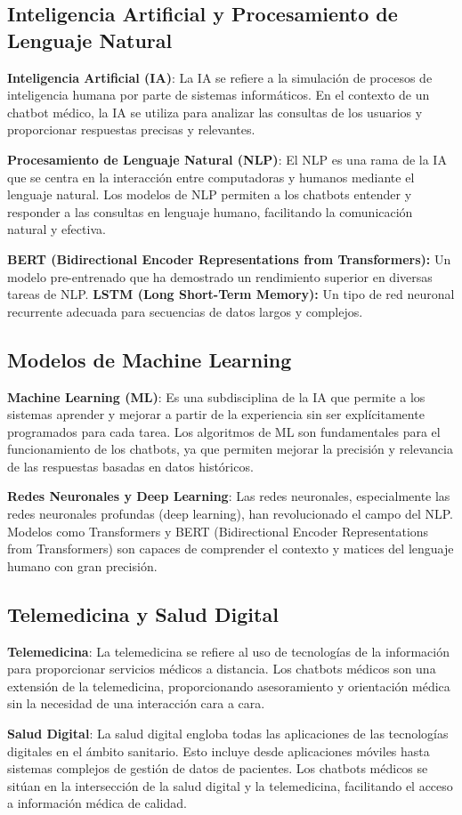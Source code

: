 
\subsection{Inteligencia Artificial y Procesamiento de Lenguaje Natural}

\textbf{Inteligencia Artificial (IA)}: La IA se refiere a la simulación de procesos de inteligencia humana por parte de sistemas informáticos. En el contexto de un chatbot médico, la IA se utiliza para analizar las consultas de los usuarios y proporcionar respuestas precisas y relevantes.

\textbf{Procesamiento de Lenguaje Natural (NLP)}: El NLP es una rama de la IA que se centra en la interacción entre computadoras y humanos mediante el lenguaje natural. Los modelos de NLP permiten a los chatbots entender y responder a las consultas en lenguaje humano, facilitando la comunicación natural y efectiva.

\subitem \textbf {BERT (Bidirectional Encoder Representations from Transformers):} Un modelo pre-entrenado que ha demostrado un rendimiento superior en diversas tareas de NLP.
\subitem \textbf {LSTM (Long Short-Term Memory):} Un tipo de red neuronal recurrente adecuada para secuencias de datos largos y complejos.

\subsection{Modelos de Machine Learning}

\textbf{Machine Learning (ML)}: Es una subdisciplina de la IA que permite a los sistemas aprender y mejorar a partir de la experiencia sin ser explícitamente programados para cada tarea. Los algoritmos de ML son fundamentales para el funcionamiento de los chatbots, ya que permiten mejorar la precisión y relevancia de las respuestas basadas en datos históricos.

\textbf{Redes Neuronales y Deep Learning}: Las redes neuronales, especialmente las redes neuronales profundas (deep learning), han revolucionado el campo del NLP. Modelos como Transformers y BERT (Bidirectional Encoder Representations from Transformers) son capaces de comprender el contexto y matices del lenguaje humano con gran precisión.

\subsection{Telemedicina y Salud Digital}

\textbf{Telemedicina}: La telemedicina se refiere al uso de tecnologías de la información para proporcionar servicios médicos a distancia. Los chatbots médicos son una extensión de la telemedicina, proporcionando asesoramiento y orientación médica sin la necesidad de una interacción cara a cara.

\textbf{Salud Digital}: La salud digital engloba todas las aplicaciones de las tecnologías digitales en el ámbito sanitario. Esto incluye desde aplicaciones móviles hasta sistemas complejos de gestión de datos de pacientes. Los chatbots médicos se sitúan en la intersección de la salud digital y la telemedicina, facilitando el acceso a información médica de calidad.